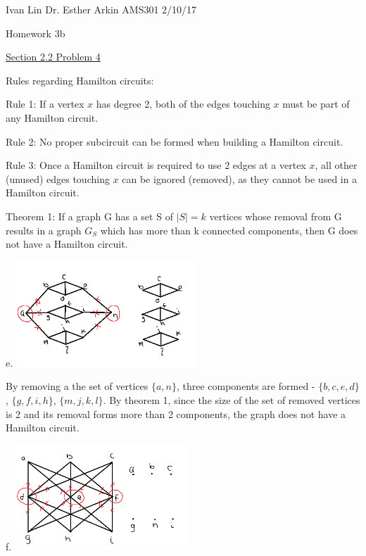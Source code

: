 \documentclass{article}
\begin{document}
Ivan Lin\newline{}
Dr. Esther Arkin\newline{}
AMS301\newline{}
2/10/17

\begin{center}
  Homework 3b
\end{center}

\underline{Section 2.2 Problem 4}

Rules regarding Hamilton circuits:

Rule 1: If a vertex $x$ has degree 2, both of the edges touching $x$ must be part of any Hamilton circuit.

Rule 2: No proper subcircuit can be formed when building a Hamilton circuit.

Rule 3: Once a Hamilton circuit is required to use 2 edges at a vertex $x$, all other (unused) edges touching $x$ can be ignored (removed), as they cannot be used in a Hamilton circuit.

Theorem 1: If a graph G has a set S of $|S| = k$ vertices whose removal from G results in a graph $G_S$ which has more than k connected components, then G does not have a Hamilton circuit.

e. \newline{}\includegraphics[height=150px]{hw2be.png}

By removing a the set of vertices $\{a,n\}$, three components are formed - $\{b,c,e,d\}$, $\{g,f,i,h\}$, $\{m,j,k,l\}$. By theorem 1, since the size of the set of removed vertices is 2 and its removal forms more than 2 components, the graph does not have a Hamilton circuit.

f. \newline{}\includegraphics[height=150px]{hw2bf.png}
\end{document}
